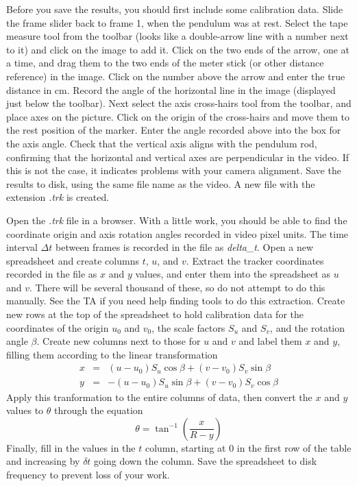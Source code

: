 \documentclass{revtex4}
\begin{document}
Before you save the results, you should first include some calibration data.
Slide the frame slider back to frame 1, when the pendulum was at rest.
Select the tape measure tool from the toolbar (looks like a double-arrow
line with a number next to it) and click on the image to add it.  Click
on the two ends of the arrow, one at a time, and drag them to the two ends
of the meter stick (or other distance reference) in the image.  Click on
the number above the arrow and enter the true distance in cm.  Record the
angle of the horizontal line in the image (displayed just below the toolbar).
Next select the axis cross-hairs tool from the toolbar, and place axes on
the picture.  Click on the origin of the cross-hairs and move them to the
rest position of the marker.  Enter the angle recorded above into the box
for the axis angle.  Check that the vertical axis aligns with the pendulum
rod, confirming that the horizontal and vertical axes are perpendicular in
the video.  If this is not the case, it indicates problems with your camera
alignment.  Save the results to disk, using the same file name as the
video.  A new file with the extension {\em .trk} is created.

Open the {\em .trk} file in a browser.  With a little work, you should
be able to find the coordinate origin and axis rotation angles recorded
in video pixel units.  The time interval $\Delta t$ between frames is
recorded in the file as {\em delta\_t}.  Open a new spreadsheet and create
columns $t$, $u$, and $v$.  Extract the tracker coordinates recorded in
the file as $x$ and $y$ values, and enter them into the spreadsheet as
$u$ and $v$.  There will be several thousand of these, so do not attempt
to do this manually.  See the TA if you need help finding tools to do
this extraction.  Create new rows at the top of the spreadsheet to hold
calibration data for the coordinates of the origin $u_0$ and $v_0$, the
scale factors $S_u$ and $S_v$, and the rotation angle $\beta$.  Create
new columns next to those for $u$ and $v$ and label them $x$ and $y$,
filling them according to the linear transformation
\begin{eqnarray}
x &=& (u-u_0)S_u\cos\beta + (v-v_0)S_v\sin\beta \nonumber \\
y &=& -(u-u_0)S_u\sin\beta + (v-v_0)S_v\cos\beta \nonumber
\end{eqnarray}
Apply this tranformation to the entire columns of data, then convert
the $x$ and $y$ values to $\theta$ through the equation
\begin{equation}
\theta = \tan^{-1}\left(\frac{x}{R-y}\right)
\end{equation}
Finally, fill in the values in the $t$ column, starting at 0 in the first
row of the table and increasing by $\delta t$ going down the column.
Save the spreadsheet to disk frequency to prevent loss of your work.
\end{document}

